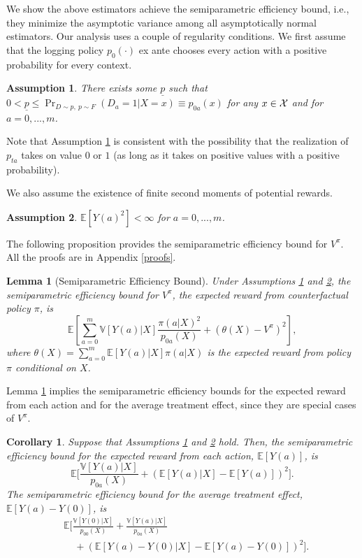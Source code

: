 \documentclass[letterpaper]{article} \usepackage{aaai19}  \usepackage{times}  \usepackage{helvet}  \usepackage{courier}  \usepackage{url}  \usepackage{graphicx}  \frenchspacing  \usepackage{comment}
\newtheorem{assumption}{Assumption}
\newtheorem{corollary}{Corollary}
\newtheorem{lemma}{Lemma}
\begin{document}
We show the above estimators achieve the semiparametric efficiency bound, i.e., they minimize the asymptotic variance among all asymptotically normal estimators. Our analysis uses a couple of regularity conditions. 
We first assume that the logging policy $p_{0}(\cdot)$ ex ante chooses every action with a positive probability for every context.


\begin{assumption}\label{nondegeneracy}
	There exists some $\underline{p}$ such that $0<\underline{p}\le \Pr_{D\sim p, ~p\sim F}(D_{a}=1|X=x)\equiv p_{0a}(x)$ for any $x\in{\cal X}$ and for $a=0,...,m$.
\end{assumption}

\noindent Note that Assumption \ref{nondegeneracy} is consistent with the possibility that the realization of $p_{ta}$ takes on value $0$ or $1$ (as long as it takes on positive values with a positive probability).

We also assume the existence of finite second moments of potential rewards. 

\begin{assumption}\label{finite_variance}
	$\mathbb{E}[Y(a)^2]<\infty$ for $a=0,...,m$.
\end{assumption}

The following proposition provides the semiparametric efficiency bound for $V^{\pi}$. 
All the proofs are in Appendix \ref{proofs}. 

\begin{lemma}[Semiparametric Efficiency Bound]\label{prop:bound:stationary}
	Under Assumptions \ref{nondegeneracy} and \ref{finite_variance}, the semiparametric efficiency bound for $V^{\pi}$, the expected reward from counterfactual policy $\pi$, is
	$$
	\mathbb{E}[\sum_{a=0}^m \mathbb{V}[Y(a)|X]\frac{\pi(a|X)^2}{p_{0a}(X)}+(\theta(X)-V^{\pi})^2],
	$$
	where $\theta(X)=\sum_{a=0}^m \mathbb{E}[Y(a)|X]\pi(a|X)$ is the expected reward from policy $\pi$ conditional on $X$.
\end{lemma}

Lemma \ref{prop:bound:stationary} implies the semiparametric efficiency bounds for the expected reward from each action and for the average treatment effect, since they are special cases of $V^\pi$.

\begin{corollary}\label{corollary:bound:action}
	Suppose that Assumptions \ref{nondegeneracy} and \ref{finite_variance} hold.
	Then, the semiparametric efficiency bound for the expected reward from each action, $\mathbb{E}[Y(a)]$, is
	$$
	\mathbb{E}\bigl[\frac{\mathbb{V}[Y(a)|X]}{p_{0a}(X)}+(\mathbb{E}[Y(a)|X]-\mathbb{E}[Y(a)])^2\bigr].
	$$
	The semiparametric efficiency bound for the average treatment effect, $\mathbb{E}[Y(a)-Y(0)]$, is
	\begin{align*}
	&\mathbb{E}\bigl[\frac{\mathbb{V}[Y(0)|X]}{p_{00}(X)}+\frac{\mathbb{V}[Y(a)|X]}{p_{0a}(X)}\\
	&~~~~~+(\mathbb{E}[Y(a)-Y(0)|X]-\mathbb{E}[Y(a)-Y(0)])^2\bigr].
	\end{align*}
\end{corollary}
\end{document}
